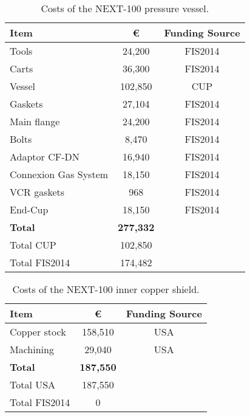 \begin{table}[h!]
\begin{center}
\begin{tabular}{|l|c|c|}
\hline
 Item & \euro & Funding Source \\
 \hline
Tools &	24,200 & FIS2014 \\
Carts &	 36,300 & FIS2014 \\
Vessel	& 102,850 & CUP \\
Gaskets 	& 27,104 & FIS2014 \\
Main flange &	24,200 & FIS2014 \\
Bolts & 8,470 & FIS2014 \\
Adaptor CF-DN	 &	16,940 & FIS2014 \\
Connexion Gas System	& 18,150 & FIS2014 \\ 
VCR gaskets	& 968 & FIS2014 \\ 
End-Cup & 18,150 & FIS2014 \\ 
\hline
{\bf Total}	& {\bf277,332 } & \\	
Total CUP	& 102,850 & \\	
Total FIS2014	& 174,482 & \\	
 \hline\hline
\end{tabular}  
\caption{Costs of the NEXT-100 pressure vessel.}
\label{tab.n100:PV}
\end{center}
\end{table} 

\begin{table}[h!]
\begin{center}
\begin{tabular}{|l|c|c|}
\hline
 Item & \euro & Funding Source \\
 \hline
 Copper stock &	158,510 &	USA \\
Machining & 29,040 &	USA \\
 \hline
{\bf Total} &	{\bf 187,550} & \\		
Total USA	& 187,550 & \\
Total FIS2014	& 0 & \\	
 \hline\hline
\end{tabular}  
\caption{Costs of the NEXT-100 inner copper shield.}
\label{tab.n100:ICS}
\end{center}
\end{table} 

